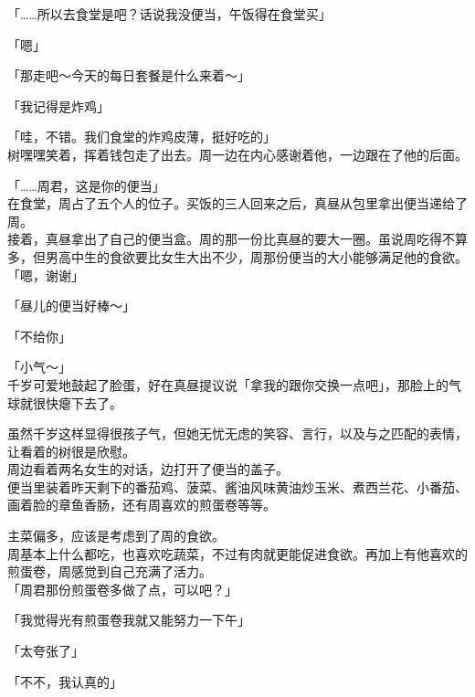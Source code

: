 「……所以去食堂是吧？话说我没便当，午饭得在食堂买」

「嗯」

「那走吧～今天的每日套餐是什么来着～」

「我记得是炸鸡」

「哇，不错。我们食堂的炸鸡皮薄，挺好吃的」\\

树嘿嘿笑着，挥着钱包走了出去。周一边在内心感谢着他，一边跟在了他的后面。\\

\vspace{2\baselineskip}

「……周君，这是你的便当」\\

在食堂，周占了五个人的位子。买饭的三人回来之后，真昼从包里拿出便当递给了周。\\

接着，真昼拿出了自己的便当盒。周的那一份比真昼的要大一圈。虽说周吃得不算多，但男高中生的食欲要比女生大出不少，周那份便当的大小能够满足他的食欲。\\

「嗯，谢谢」

「昼儿的便当好棒～」

「不给你」

「小气～」\\

千岁可爱地鼓起了脸蛋，好在真昼提议说「拿我的跟你交换一点吧」，那脸上的气球就很快瘪下去了。

虽然千岁这样显得很孩子气，但她无忧无虑的笑容、言行，以及与之匹配的表情，让看着的树很是欣慰。\\

周边看着两名女生的对话，边打开了便当的盖子。\\

便当里装着昨天剩下的番茄鸡、菠菜、酱油风味黄油炒玉米、煮西兰花、小番茄、画着脸的章鱼香肠，还有周喜欢的煎蛋卷等等。

主菜偏多，应该是考虑到了周的食欲。\\

周基本上什么都吃，也喜欢吃蔬菜，不过有肉就更能促进食欲。再加上有他喜欢的煎蛋卷，周感觉到自己充满了活力。\\

「周君那份煎蛋卷多做了点，可以吧？」

「我觉得光有煎蛋卷我就又能努力一下午」

「太夸张了」

「不不，我认真的」\\

